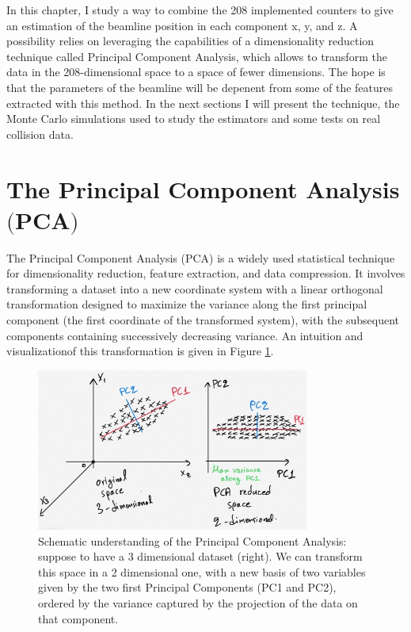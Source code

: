 In this chapter, I study a way to combine the 208 implemented counters to give an estimation of the beamline position in each component x, y, and z. A possibility relies on leveraging the capabilities of a dimensionality reduction technique called Principal Component Analysis, which allows to transform the data in the 208-dimensional space to a space of fewer dimensions. The hope is that the parameters of the beamline will be depenent from some of the features extracted with this method. In the next sections I will present the technique, the Monte Carlo simulations used to study the estimators and some tests on real collision data.



\section[The Principal Component Analysis]{The Principal Component Analysis $\bigl($PCA$\bigr)$}

The Principal Component Analysis (PCA) is a widely used statistical technique for dimensionality reduction, feature extraction, and data compression. It involves transforming a dataset into a new coordinate system with a linear orthogonal transformation designed to maximize the variance along the first principal component (the first coordinate of the transformed system), with the subsequent components containing successively decreasing variance.
An intuition and visualizationof this transformation is given in Figure \ref{fig:pca}.

\begin{figure}
    \centering
    \includegraphics[width=0.8\textwidth]{figures/pca.jpg}
    \caption{Schematic understanding of the Principal Component Analysis: suppose to have a 3 dimensional dataset (right). We can transform this space in a 2 dimensional one, with a new basis of two variables given by the two first Principal Components (PC1 and PC2), ordered by the variance captured by the projection of the data on that component.}
    \label{fig:pca}
\end{figure}


